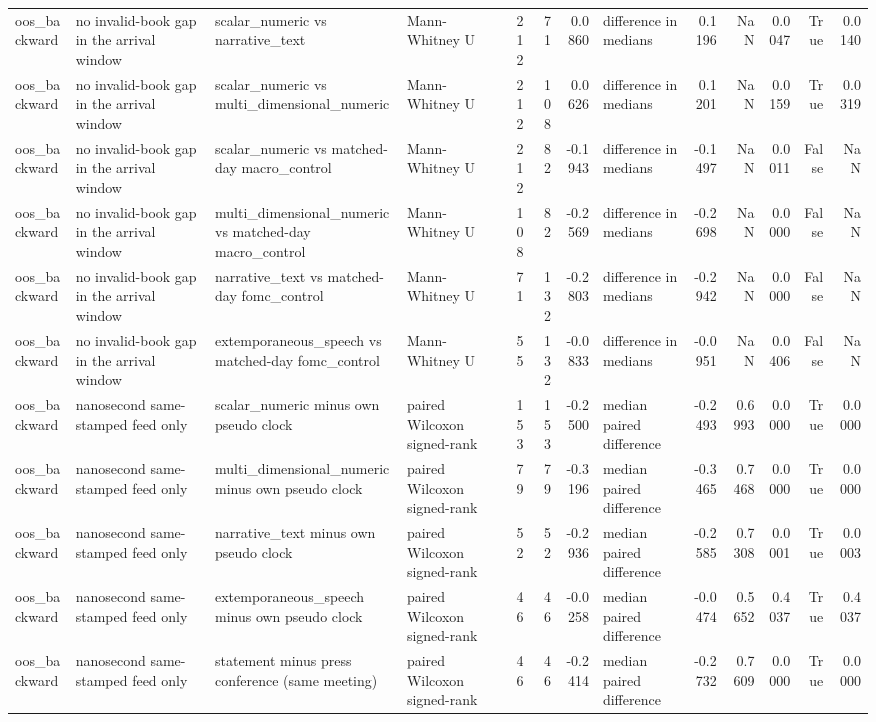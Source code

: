 \begin{tabular}{llllrrrlrrrrr}
oos_backward & no invalid-book gap in the arrival window & scalar_numeric vs narrative_text & Mann-Whitney U & 212 & 71 & 0.0860 & difference in medians & 0.1196 & NaN & 0.0047 & True & 0.0140 \\
oos_backward & no invalid-book gap in the arrival window & scalar_numeric vs multi_dimensional_numeric & Mann-Whitney U & 212 & 108 & 0.0626 & difference in medians & 0.1201 & NaN & 0.0159 & True & 0.0319 \\
oos_backward & no invalid-book gap in the arrival window & scalar_numeric vs matched-day macro_control & Mann-Whitney U & 212 & 82 & -0.1943 & difference in medians & -0.1497 & NaN & 0.0011 & False & NaN \\
oos_backward & no invalid-book gap in the arrival window & multi_dimensional_numeric vs matched-day macro_control & Mann-Whitney U & 108 & 82 & -0.2569 & difference in medians & -0.2698 & NaN & 0.0000 & False & NaN \\
oos_backward & no invalid-book gap in the arrival window & narrative_text vs matched-day fomc_control & Mann-Whitney U & 71 & 132 & -0.2803 & difference in medians & -0.2942 & NaN & 0.0000 & False & NaN \\
oos_backward & no invalid-book gap in the arrival window & extemporaneous_speech vs matched-day fomc_control & Mann-Whitney U & 55 & 132 & -0.0833 & difference in medians & -0.0951 & NaN & 0.0406 & False & NaN \\
oos_backward & nanosecond same-stamped feed only & scalar_numeric minus own pseudo clock & paired Wilcoxon signed-rank & 153 & 153 & -0.2500 & median paired difference & -0.2493 & 0.6993 & 0.0000 & True & 0.0000 \\
oos_backward & nanosecond same-stamped feed only & multi_dimensional_numeric minus own pseudo clock & paired Wilcoxon signed-rank & 79 & 79 & -0.3196 & median paired difference & -0.3465 & 0.7468 & 0.0000 & True & 0.0000 \\
oos_backward & nanosecond same-stamped feed only & narrative_text minus own pseudo clock & paired Wilcoxon signed-rank & 52 & 52 & -0.2936 & median paired difference & -0.2585 & 0.7308 & 0.0001 & True & 0.0003 \\
oos_backward & nanosecond same-stamped feed only & extemporaneous_speech minus own pseudo clock & paired Wilcoxon signed-rank & 46 & 46 & -0.0258 & median paired difference & -0.0474 & 0.5652 & 0.4037 & True & 0.4037 \\
oos_backward & nanosecond same-stamped feed only & statement minus press conference (same meeting) & paired Wilcoxon signed-rank & 46 & 46 & -0.2414 & median paired difference & -0.2732 & 0.7609 & 0.0000 & True & 0.0000 \\

\end{tabular}
